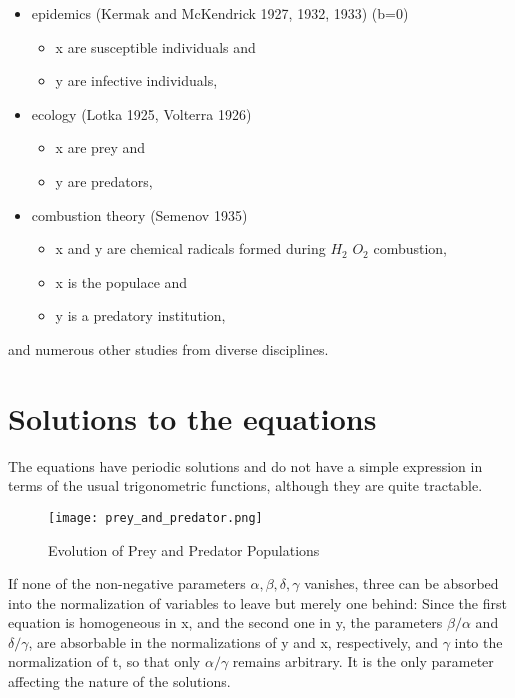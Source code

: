 \documentclass{article}
\begin{document}
\begin{itemize}
\item epidemics (Kermak and McKendrick 1927, 1932, 1933) (b=0)
\begin{itemize}
\item x are susceptible individuals and
\item y are infective individuals,
\end{itemize}

\item ecology (Lotka 1925, Volterra 1926)

\begin{itemize}
\item x are prey and
\item y are predators,
\end{itemize}
\item combustion theory (Semenov 1935)
\begin{itemize}
\item x and y are chemical radicals formed during $H_2$ $O_2$ combustion,
\end{itemize}
\begin{itemize}
\item x is the populace and
\item y is a predatory institution,
\end{itemize}
\end{itemize}

and numerous other studies from diverse disciplines.

\section{Solutions to the equations}
The equations have periodic solutions and do not have a simple expression in terms of the usual trigonometric functions, although they are quite tractable.

\begin{figure}[h]
\begin{center}
\texttt{[image: prey\_and\_predator.png]}
\caption{Evolution of Prey and Predator Populations}\label{fig:1}
\end{center}
\end{figure}

If none of the non-negative parameters $\alpha, \beta, \delta,  \gamma$ vanishes, three can be absorbed into the normalization of variables to leave but merely one behind: Since the first equation is homogeneous in x, and the second one in y, the parameters $\beta / \alpha$ and $\delta / \gamma$, are absorbable in the normalizations of y and x, respectively, and $\gamma$ into the normalization of t, so that only $\alpha / \gamma$ remains arbitrary. It is the only parameter affecting the nature of the solutions.
\end{document}
